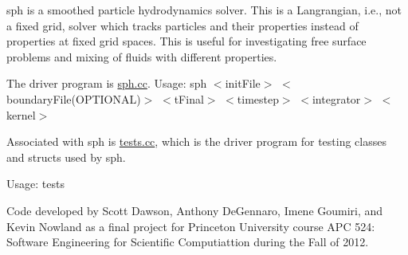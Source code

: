 sph is a smoothed particle hydrodynamics solver. \-This is a \-Langrangian, i.\-e., not a fixed grid, solver which tracks particles and their properties instead of properties at fixed grid spaces. \-This is useful for investigating free surface problems and mixing of fluids with different properties.

\-The driver program is \hyperlink{sph_8cc}{sph.\-cc}. \-Usage\-: sph $<$init\-File$>$ $<$boundary\-File(\-O\-P\-T\-I\-O\-N\-A\-L)$>$ $<$t\-Final$>$ $<$timestep$>$ $<$integrator$>$ $<$kernel$>$

\-Associated with sph is \hyperlink{tests_8cc}{tests.\-cc}, which is the driver program for testing classes and structs used by sph.

\-Usage\-: tests

\par
 \par
 \par


\-Code developed by \-Scott \-Dawson, \-Anthony \-De\-Gennaro, \-Imene \-Goumiri, and \-Kevin \-Nowland as a final project for \-Princeton \-University course \-A\-P\-C 524\-: \-Software \-Engineering for \-Scientific \-Computiattion during the \-Fall of 2012. 